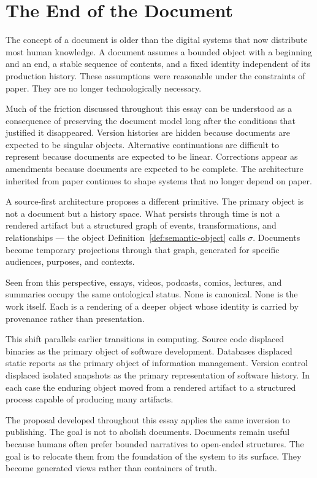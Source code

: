 \documentclass[11pt]{article}
\theoremstyle{definition}
\begin{document}
\section{The End of the Document}
\label{sec:end-of-document}

The concept of a document is older than the digital systems that now distribute most human knowledge. A document assumes a bounded object with a beginning and an end, a stable sequence of contents, and a fixed identity independent of its production history. These assumptions were reasonable under the constraints of paper. They are no longer technologically necessary.

Much of the friction discussed throughout this essay can be understood as a consequence of preserving the document model long after the conditions that justified it disappeared. Version histories are hidden because documents are expected to be singular objects. Alternative continuations are difficult to represent because documents are expected to be linear. Corrections appear as amendments because documents are expected to be complete. The architecture inherited from paper continues to shape systems that no longer depend on paper.

A source-first architecture proposes a different primitive. The primary object is not a document but a history space. What persists through time is not a rendered artifact but a structured graph of events, transformations, and relationships --- the object Definition~\ref{def:semantic-object} calls $\sigma$. Documents become temporary projections through that graph, generated for specific audiences, purposes, and contexts.

Seen from this perspective, essays, videos, podcasts, comics, lectures, and summaries occupy the same ontological status. None is canonical. None is the work itself. Each is a rendering of a deeper object whose identity is carried by provenance rather than presentation.

This shift parallels earlier transitions in computing. Source code displaced binaries as the primary object of software development. Databases displaced static reports as the primary object of information management. Version control displaced isolated snapshots as the primary representation of software history. In each case the enduring object moved from a rendered artifact to a structured process capable of producing many artifacts.

The proposal developed throughout this essay applies the same inversion to publishing. The goal is not to abolish documents. Documents remain useful because humans often prefer bounded narratives to open-ended structures. The goal is to relocate them from the foundation of the system to its surface. They become generated views rather than containers of truth.
\end{document}
